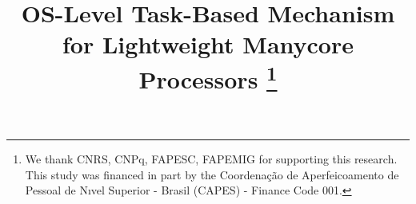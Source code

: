 \documentclass[conference]{IEEEtran}
\begin{document}
\title{
	OS-Level Task-Based Mechanism for Lightweight Manycore Processors
\thanks{%
		We thank CNRS, CNPq, FAPESC, FAPEMIG for supporting this
		research. This study was financed in part by the Coordenação de
		Aperfeicoamento de Pessoal de Nıvel Superior - Brasil (CAPES) -
		Finance Code 001.
	}
}

\author{%
	\and
	\and
}

\maketitle

	
	
	
	
	
	
	
	

	
\end{document}
